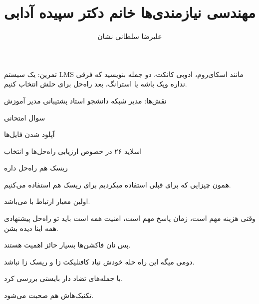 \documentclass[a4paper]{article}
\title{مهندسی نیازمندی‌ها خانم دکتر سپیده آدابی}
\author{علیرضا سلطانی نشان}
\begin{document}
\maketitle

تمرین: یک سیستم LMS مانند اسکای‌روم، ادوبی کانکت، دو جمله بنویسید که فرقی نداره
ویک باشه یا استرانگ، بعد راه‌حل برای حلش انتخاب کنیم.

نقش‌ها:
مدیر شبکه
دانشجو
استاد
پشتیبانی
مدیر آموزش

سوال امتحانی

آپلود شدن فایل‌ها

اسلاید ۲۶ در خصوص ارزیابی راه‌حل‌ها و انتخاب

ریسک هم راه‌حل داره

همون چیزایی که برای قبلی استفاده میکردیم برای ریسک هم استفاده می‌کنیم.

اولین معیار ارتباط با  می‌باشد.

وقتی هزینه مهم است، زمان پاسخ مهم است، امنیت همه است 
باید تو راه‌حل پیشنهادی همه اینا دیده بشن.

پس نان فاکشن‌ها بسیار حائز اهمیت هستند.

دومی میگه این راه حله خودش نیاد کافنلیکت زا و ریسک زا نباشد.

با جمله‌های تضاد دار بایستی بررسی کرد.

تکنیک‌هاش هم صحبت می‌شود.
\end{document}
